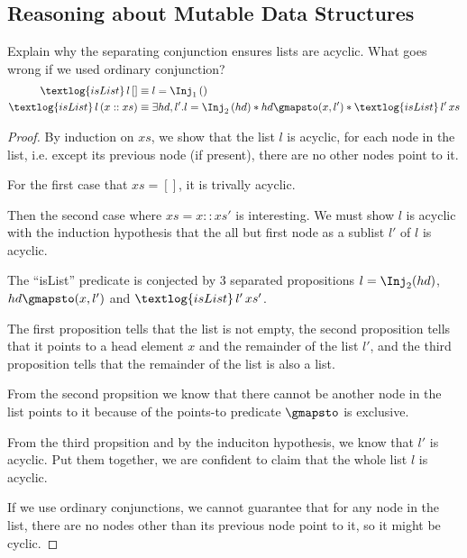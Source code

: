 \subsection{Reasoning about Mutable Data Structures}
\setcounter{exercise}{18}

\begin{exercise}
  Explain why the separating conjunction ensures lists are acyclic. What goes
  wrong if we used ordinary conjunction?
  \begin{align*}
    \textlog{isList}\, l\, [] & \equiv l = \Inj_1\, () \\
    \textlog{isList}\, l\, (x :: xs) & \equiv \exists hd, l'.
    l = \Inj_2\,(hd) * hd \gmapsto (x, l') * \textlog{isList}\, l'\, xs
  \end{align*}
\end{exercise}

\begin{proof}
  By induction on $xs$, we show that the list $l$ is acyclic, for each node in the
  list, i.e. except its previous node (if present), there are no other nodes point
  to it.

  For the first case that $xs = []$, it is trivally acyclic.

  Then the second case where $xs = x :: xs'$ is interesting. We must show $l$ is
  acyclic with the induction hypothesis that the all but first node as a sublist
  $l'$ of $l$ is acyclic.

  The ``isList'' predicate is conjected by 3 separated propositions $l =
  \Inj_2(hd)$, $hd \gmapsto (x, l')$ and $\textlog{isList}\, l'\, xs'$.

  The first proposition tells that the list is not empty, the second proposition
  tells that it points to a head element $x$ and the remainder of the list $l'$,
  and the third proposition tells that the remainder of the list is also a list.

  From the second propsition we know that there cannot be another node in the list
  points to it because of the points-to predicate $\gmapsto$ is exclusive.

  From the third propsition and by the induciton hypothesis, we know that $l'$ is
  acyclic. Put them together, we are confident to claim that the whole list $l$ is
  acyclic.

  If we use ordinary conjunctions, we cannot guarantee that for any node in the
  list, there are no nodes other than its previous node point to it, so it might
  be cyclic.
\end{proof}

